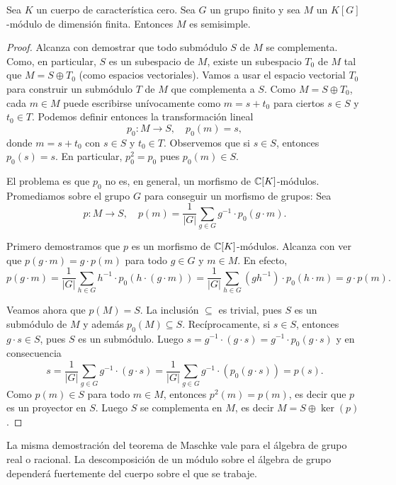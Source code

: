 %
\begin{theorem}[Maschke]
Sea $K$ un cuerpo de característica cero. 
Sea $G$ un grupo finito y sea $M$ un $K[G]$-módulo de dimensión finita. Entonces
$M$ es semisimple.
\end{theorem}

\begin{proof}
Alcanza con demostrar que todo submódulo $S$ de $M$ se complementa. 
Como, en particular, $S$ es un subespacio de $M$, existe un subespacio $T_0$ de $M$ 
tal que $M=S\oplus T_0$ (como espacios vectoriales). Vamos a usar el espacio vectorial
$T_0$ para construir un submódulo $T$ de $M$ que complementa a $S$. Como $M=S\oplus T_0$, 
cada $m\in M$ puede escribirse unívocamente como $m=s+t_0$ para ciertos $s\in S$ y $t_0\in T$. 
Podemos definir entonces la transformación lineal 
\[
p_0\colon M\to S,\quad
p_0(m)=s,
\]
donde $m=s+t_0$ con $s\in S$ y $t_0\in T$. 
Observemos que si $s\in S$, entonces $p_0(s)=s$. En particular, $p_0^2=p_0$ pues
$p_0(m)\in S$. 

El problema 
es que $p_0$ no es, en general, un morfismo de $\mathbb{C}[K]$-módulos. Promediamos
sobre el grupo $G$ para conseguir un morfismo de grupos: Sea 
\[
p\colon M\to S,\quad
p(m)=\frac{1}{|G|}\sum_{g\in G}g^{-1}\cdot p_0(g\cdot m).
\]

Primero demostramos que $p$ es un morfismo de $\mathbb{C}[K]$-módulos. Alcanza con ver que
$p(g\cdot m)=g\cdot p(m)$ para todo $g\in G$ y $m\in M$. En efecto,
\[
p(g\cdot m)=\frac{1}{|G|}\sum_{h\in G}h^{-1}\cdot p_0(h\cdot (g\cdot m))
=\frac{1}{|G|}\sum_{h\in G}(gh^{-1})\cdot p_0(h\cdot m)=g\cdot p(m).
\]

Veamos ahora que $p(M)=S$. La inclusión $\subseteq$ es trivial, pues $S$ es un submódulo de $M$ 
y además $p_0(M)\subseteq S$. Recíprocamente, si $s\in S$, entonces $g\cdot s\in S$, pues
$S$ es un submódulo. Luego 
$s=g^{-1}\cdot (g\cdot s)=g^{-1}\cdot p_0(g\cdot s)$ y en consecuencia
\[
s=\frac{1}{|G|}\sum_{g\in G}g^{-1}\cdot (g\cdot s)=\frac{1}{|G|}\sum_{g\in G}g^{-1}\cdot (p_0(g\cdot s))=p(s).
\]
Como $p(m)\in S$ para todo $m\in M$, entonces $p^2(m)=p(m)$, es decir que $p$ es un proyector en $S$. Luego $S$ se complementa en $M$, es decir $M=S\oplus\ker(p)$.
\end{proof} 

La misma demostración del teorema de Maschke vale para el álgebra de grupo real o racional. 
La descomposición de un módulo sobre el álgebra de grupo dependerá
fuertemente del cuerpo sobre el que se trabaje. 

